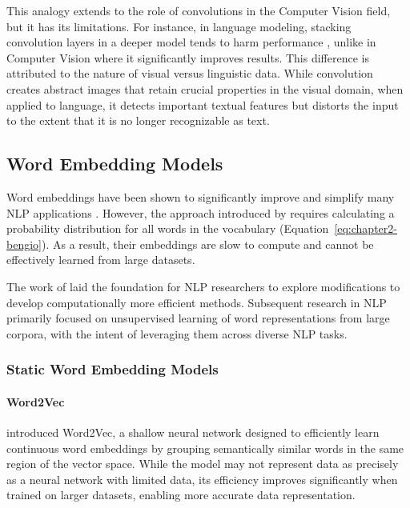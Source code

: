 This analogy extends to the role of convolutions in the Computer Vision field, but it has its limitations. For instance, in language modeling, stacking convolution layers in a deeper model tends to harm performance \citep{pham2016convolutional}, unlike in Computer Vision where it significantly improves results. This difference is attributed to the nature of visual versus linguistic data. While convolution creates abstract images that retain crucial properties in the visual domain, when applied to language, it detects important textual features but distorts the input to the extent that it is no longer recognizable as text.

\subsection{Word Embedding Models}

Word embeddings have been shown to significantly improve and simplify many \ac{NLP} applications \citep{collobert2011natural}. However, the approach introduced by \citet{bengio2000neural} requires calculating a probability distribution for all words in the vocabulary (Equation~\ref{eq:chapter2-bengio}). As a result, their embeddings are slow to compute and cannot be effectively learned from large datasets. 

The work of \citet{bengio2000neural} laid the foundation for \ac{NLP} researchers to explore modifications to develop computationally more efficient methods. Subsequent research in \ac{NLP} primarily focused on unsupervised learning of word representations from large corpora, with the intent of leveraging them across diverse \ac{NLP} tasks.


\subsubsection{Static Word Embedding Models} 

\paragraph{Word2Vec}

\citet{mikolov2013efficient} introduced Word2Vec, a shallow neural network designed to efficiently learn continuous word embeddings by grouping semantically similar words in the same region of the vector space. While the model may not represent data as precisely as a neural network with limited data, its efficiency improves significantly when trained on larger datasets, enabling more accurate data representation. 


